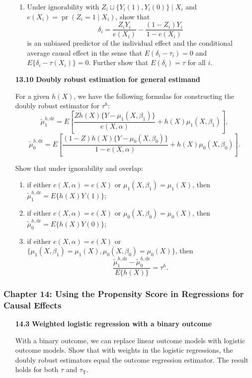 \documentclass[11pt]{article}
\begin{document}
\begin{enumerate}[label=\textbf{13.\arabic*}]
\begin{enumerate}
\item Under $\text{ignorability}$ with $Z_{i} \sqcup \{Y_{i}(1), Y_{i}(0)\} \mid X_{i}$ and $e(X_{i}) = \operatorname{pr}(Z_{i} = 1 \mid X_{i})$, show that
\[
\delta_{i} = \frac{Z_{i} Y_{i}}{e(X_{i})} - \frac{(1 - Z_{i}) Y_{i}}{1 - e(X_{i})}
\]
is an unbiased predictor of the individual effect and the conditional average causal effect in the sense that $E(\delta_{i} - \tau_{i}) = 0$ and $E\{\delta_{i} - \tau(X_{i})\} = 0$. Further show that $E(\delta_i) = \tau$ for all $i$.
\end{enumerate}

\item[\textbf{13.10}] \textbf{Doubly robust estimation for general estimand}

For a given $h(X)$, we have the following formulas for constructing the doubly robust estimator for $\tau^h$:
\[
\tilde{\mu}_1^{h,\mathrm{dr}} = E \left[ \frac{Z h(X) \{Y - \mu_1(X, \beta_1)\}}{e(X, \alpha)} + h(X) \mu_1(X, \beta_1) \right],
\]
\[
\tilde{\mu}_0^{h,\mathrm{dr}} = E \left[ \frac{(1 - Z) h(X) \{Y - \mu_0(X, \beta_0)\}}{1 - e(X, \alpha)} + h(X) \mu_0(X, \beta_0) \right].
\]

Show that under ignorability and overlap:
\begin{enumerate}
\item if either $e(X, \alpha) = e(X)$ or $\mu_1(X, \beta_1) = \mu_1(X)$, then $\tilde{\mu}_1^{h,\mathrm{dr}} = E\{h(X)Y(1)\}$;
\item if either $e(X, \alpha) = e(X)$ or $\mu_0(X, \beta_0) = \mu_0(X)$, then $\tilde{\mu}_0^{h,\mathrm{dr}} = E\{h(X)Y(0)\}$;
\item if either $e(X, \alpha) = e(X)$ or $\{\mu_1(X, \beta_1) = \mu_1(X), \mu_0(X, \beta_0) = \mu_0(X)\}$, then
\[
\frac{\tilde{\mu}_1^{h,\mathrm{dr}} - \tilde{\mu}_0^{h,\mathrm{dr}}}{E\{h(X)\}} = \tau^h.
\]
\end{enumerate}

\end{enumerate}

\subsubsection*{Chapter 14: Using the Propensity Score in Regressions for Causal Effects}

\begin{enumerate}[label=\textbf{14.\arabic*}]

\item[\textbf{14.3}] \textbf{Weighted logistic regression with a binary outcome}

With a binary outcome, we can replace linear outcome models with logistic outcome models. Show that with weights in the logistic regressions, the doubly robust estimators equal the outcome regression estimator. The result holds for both $\tau$ and $\tau_{\mathrm{T}}$.

\end{enumerate}
\end{document}
